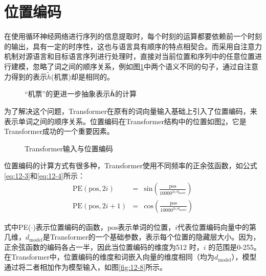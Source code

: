\sectionnewpage
\section{位置编码}

\parinterval 在使用循环神经网络进行序列的信息提取时，每个时刻的运算都要依赖前一个时刻的输出，具有一定的时序性，这也与语言具有顺序的特点相契合。而采用自注意力机制对源语言和目标语言序列进行处理时，直接对当前位置和序列中的任意位置进行建模，忽略了词之间的顺序关系，例如图\ref{fig:12-6}中两个语义不同的句子，通过自注意力得到的表示$\tilde{h}$(机票)却是相同的。

\begin{figure}[htp]
\centering

\caption{“机票”的更进一步抽象表示$\tilde{\textbf{\em h}}$的计算}
\label{fig:12-6}
\end{figure}

\parinterval 为了解决这个问题，Transformer在原有的词向量输入基础上引入了位置编码，来表示单词之间的顺序关系。位置编码在Transformer结构中的位置如图\ref{fig:12-7}，它是Transformer成功的一个重要因素。

\begin{figure}[htp]
\centering

\caption{Transformer输入与位置编码}
\label{fig:12-7}
\end{figure}

\parinterval 位置编码的计算方式有很多种，Transformer使用不同频率的正余弦函数，如公式\eqref{eq:12-3}和\eqref{eq:12-4}所示：
\begin{eqnarray}
\textrm{PE}(\textrm{pos},2i) & = & \textrm{sin} (\frac{\textrm{pos}}{10000^{2i/d_{\textrm{model}}}}) \label{eq:12-3} \\
\textrm{PE}(\textrm{pos},2i+1) & = & \textrm{cos} (\frac{\textrm{pos}}{10000^{2i/d_{\textrm{model}}}}) \label{eq:12-4}
\end{eqnarray}

\noindent 式中PE($\cdot$)表示位置编码的函数，$\textrm{pos}$表示单词的位置，$i$代表位置编码向量中的第几维，$d_{\textrm{model}}$是Transformer的一个基础参数，表示每个位置的隐藏层大小。因为，正余弦函数的编码各占一半，因此当位置编码的维度为512 时，$i$ 的范围是0-255。 在Transformer中，位置编码的维度和词嵌入向量的维度相同（均为$d_{\textrm{model}}$），模型通过将二者相加作为模型输入，如图\ref{fig:12-8}所示。

